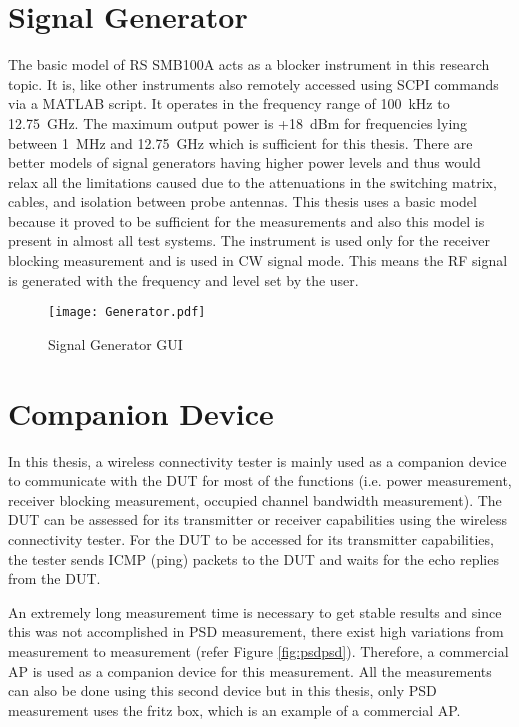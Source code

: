 \section{Signal Generator}
The basic model of \acs{RS}\textregistered{} SMB100A acts as a blocker instrument in this research topic. It is, like other instruments also remotely accessed using \acs{SCPI} commands via a MATLAB\textregistered{} script. It operates in the frequency range of 100~kHz to 12.75~GHz. The maximum output power is +18~dBm for frequencies lying between 1~MHz and 12.75~GHz which is sufficient for this thesis. There are better models of signal generators having higher power levels and thus would relax all the limitations caused due to the attenuations in the switching matrix, cables, and isolation between probe antennas. This thesis uses a basic model because it proved to be sufficient for the measurements and also this model is present in almost all test systems. The instrument is used only for the receiver blocking measurement and is used in \acs{CW} signal mode. This means the \acs{RF} signal is generated with the frequency and level set by the user.

\begin{figure}[H]
\centering
\texttt{[image: Generator.pdf]}
\caption{Signal Generator \acs{GUI} \cite{rssmb}}
\label{fig:gen}
\end{figure}

\section{Companion Device}
In this thesis, a wireless connectivity tester is mainly used as a companion device to communicate with the \acs{DUT} for most of the functions (i.e. power measurement, receiver blocking measurement, occupied channel bandwidth measurement). The \acs{DUT} can be assessed for its transmitter or receiver capabilities using the wireless connectivity tester. For the \acs{DUT} to be accessed for its transmitter capabilities, the tester sends \acf{ICMP} (ping) packets to the \acs{DUT} and waits for the echo replies from the \acs{DUT}. 

An extremely long measurement time is necessary to get stable results and since this was not accomplished in \acf{PSD} measurement, there exist high variations from measurement to measurement (refer Figure \ref{fig:psdpsd}). Therefore, a commercial \acf{AP} is used as a companion device for this measurement. All the measurements can also be done using this second device but in this thesis, only \acf{PSD} measurement uses the fritz box, which is an example of a commercial \acf{AP}.

